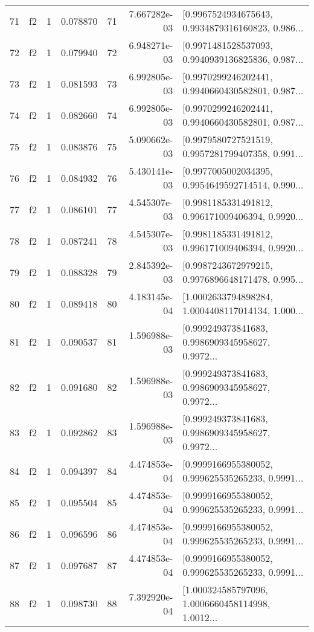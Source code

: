 \begin{tabular}{lllrlrl}
71  &  f2 &   1 &  0.078870 &   71 &  7.667282e-03 &  [0.9967524934675643, 0.9934879316160823, 0.986... \\
72  &  f2 &   1 &  0.079940 &   72 &  6.948271e-03 &  [0.9971481528537093, 0.9940939136825836, 0.987... \\
73  &  f2 &   1 &  0.081593 &   73 &  6.992805e-03 &  [0.9970299246202441, 0.9940660430582801, 0.987... \\
74  &  f2 &   1 &  0.082660 &   74 &  6.992805e-03 &  [0.9970299246202441, 0.9940660430582801, 0.987... \\
75  &  f2 &   1 &  0.083876 &   75 &  5.090662e-03 &  [0.9979580727521519, 0.9957281799407358, 0.991... \\
76  &  f2 &   1 &  0.084932 &   76 &  5.430141e-03 &  [0.9977005002034395, 0.9954649592714514, 0.990... \\
77  &  f2 &   1 &  0.086101 &   77 &  4.545307e-03 &  [0.9981185331491812, 0.996171009406394, 0.9920... \\
78  &  f2 &   1 &  0.087241 &   78 &  4.545307e-03 &  [0.9981185331491812, 0.996171009406394, 0.9920... \\
79  &  f2 &   1 &  0.088328 &   79 &  2.845392e-03 &  [0.9987243672979215, 0.9976896648171478, 0.995... \\
80  &  f2 &   1 &  0.089418 &   80 &  4.183145e-04 &  [1.0002633794898284, 1.0004408117014134, 1.000... \\
81  &  f2 &   1 &  0.090537 &   81 &  1.596988e-03 &  [0.999249373841683, 0.9986909345958627, 0.9972... \\
82  &  f2 &   1 &  0.091680 &   82 &  1.596988e-03 &  [0.999249373841683, 0.9986909345958627, 0.9972... \\
83  &  f2 &   1 &  0.092862 &   83 &  1.596988e-03 &  [0.999249373841683, 0.9986909345958627, 0.9972... \\
84  &  f2 &   1 &  0.094397 &   84 &  4.474853e-04 &  [0.9999166955380052, 0.999625535265233, 0.9991... \\
85  &  f2 &   1 &  0.095504 &   85 &  4.474853e-04 &  [0.9999166955380052, 0.999625535265233, 0.9991... \\
86  &  f2 &   1 &  0.096596 &   86 &  4.474853e-04 &  [0.9999166955380052, 0.999625535265233, 0.9991... \\
87  &  f2 &   1 &  0.097687 &   87 &  4.474853e-04 &  [0.9999166955380052, 0.999625535265233, 0.9991... \\
88  &  f2 &   1 &  0.098730 &   88 &  7.392920e-04 &  [1.000324585797096, 1.0006660458114998, 1.0012... \\

\end{tabular}
